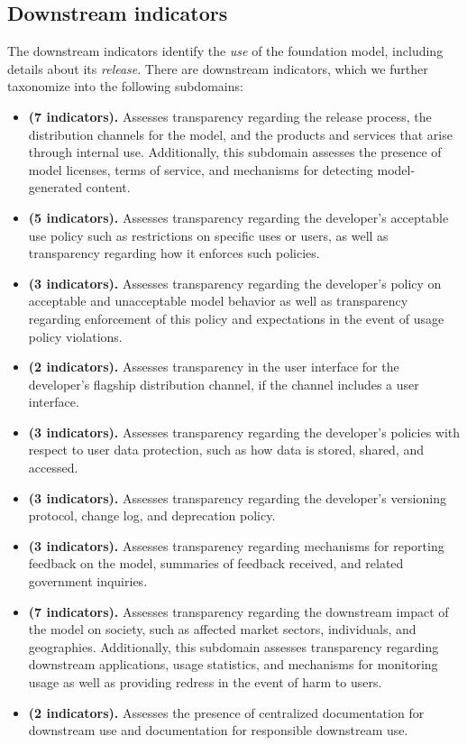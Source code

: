 \hypertarget{downstream-indicators}{\subsection{Downstream indicators}}
\label{sec:downstream-indicators}
The downstream indicators identify the \emph{use} of the foundation model, including details about its \textit{release}.
There are \numdownstreamindicators downstream indicators, which we further taxonomize into the following \numdownstreamsubdomains subdomains:

\begin{itemize}
    \item \textbf{\distribution (7 indicators).} 
    Assesses transparency regarding the release process, the distribution channels for the model, and the products and services that arise through internal use.
    Additionally, this subdomain assesses the presence of model licenses, terms of service, and mechanisms for detecting model-generated content.
    \item \textbf{\usagepolicy (5 indicators).} 
    Assesses transparency regarding the developer's acceptable use policy such as restrictions on specific uses or users, as well as transparency regarding how it enforces such policies.
    \item \textbf{\modelbehaviorpolicy (3 indicators).} 
    Assesses transparency regarding the developer's policy on acceptable and unacceptable model behavior as well as transparency regarding enforcement of this policy and expectations in the event of usage policy violations.
    \item \textbf{\interface (2 indicators).} 
    Assesses transparency in the user interface for the developer's flagship distribution channel, if the channel includes a user interface. 
    \item \textbf{\dataprotection (3 indicators).} 
    Assesses transparency regarding the developer's policies with respect to user data protection, such as how data is stored, shared, and accessed. 
    \item \textbf{\updates(3 indicators).} 
    Assesses transparency regarding the developer's versioning protocol, change log, and deprecation policy.
    \item \textbf{\feedback (3 indicators).} 
    Assesses transparency regarding mechanisms for reporting feedback on the model, summaries of feedback received, and related government inquiries.
    \item \textbf{\impact (7 indicators).} 
    Assesses transparency regarding the downstream impact of the model on society, such as affected market sectors, individuals, and geographies. 
    Additionally, this subdomain assesses transparency regarding downstream applications, usage statistics, and mechanisms for monitoring usage as well as providing redress in the event of harm to users.
    \item \textbf{\documentation (2 indicators).} 
    Assesses the presence of centralized documentation for downstream use and documentation for responsible downstream use.     
\end{itemize}

